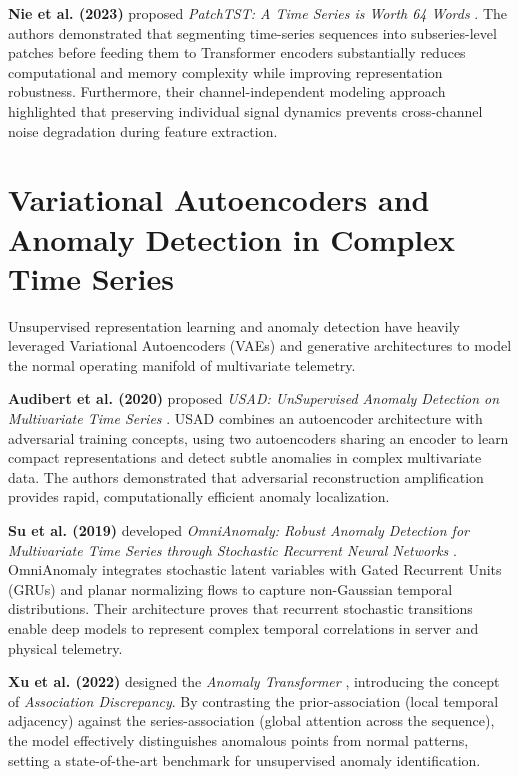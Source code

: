 \documentclass[12pt,a4paper]{report}
\begin{document}
\textbf{Nie et al. (2023)} proposed \textit{PatchTST: A Time Series is Worth 64 Words} \cite{ref_nie2023_patchtst}. The authors demonstrated that segmenting time-series sequences into subseries-level patches before feeding them to Transformer encoders substantially reduces computational and memory complexity while improving representation robustness. Furthermore, their channel-independent modeling approach highlighted that preserving individual signal dynamics prevents cross-channel noise degradation during feature extraction.

\section{Variational Autoencoders and Anomaly Detection in Complex Time Series}
Unsupervised representation learning and anomaly detection have heavily leveraged Variational Autoencoders (VAEs) and generative architectures to model the normal operating manifold of multivariate telemetry.

\textbf{Audibert et al. (2020)} proposed \textit{USAD: UnSupervised Anomaly Detection on Multivariate Time Series} \cite{ref_audibert2020_usad}. USAD combines an autoencoder architecture with adversarial training concepts, using two autoencoders sharing an encoder to learn compact representations and detect subtle anomalies in complex multivariate data. The authors demonstrated that adversarial reconstruction amplification provides rapid, computationally efficient anomaly localization.

\textbf{Su et al. (2019)} developed \textit{OmniAnomaly: Robust Anomaly Detection for Multivariate Time Series through Stochastic Recurrent Neural Networks} \cite{ref_su2019_omnianomaly}. OmniAnomaly integrates stochastic latent variables with Gated Recurrent Units (GRUs) and planar normalizing flows to capture non-Gaussian temporal distributions. Their architecture proves that recurrent stochastic transitions enable deep models to represent complex temporal correlations in server and physical telemetry.

\textbf{Xu et al. (2022)} designed the \textit{Anomaly Transformer} \cite{ref_xu2022_anomaly}, introducing the concept of \textit{Association Discrepancy}. By contrasting the prior-association (local temporal adjacency) against the series-association (global attention across the sequence), the model effectively distinguishes anomalous points from normal patterns, setting a state-of-the-art benchmark for unsupervised anomaly identification.
\end{document}
